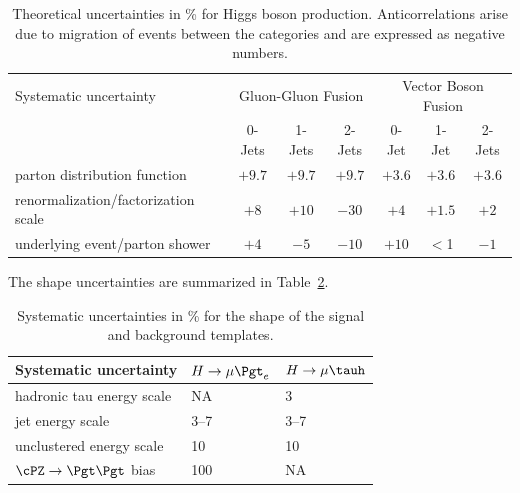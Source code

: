 \begin{table}[hbtp]
 \centering
  \caption{Theoretical uncertainties in \% for Higgs boson production. Anticorrelations arise due to  migration of events between the categories and are expressed as negative numbers. }
  \label{tab:theory_systematics}
  \begin{tabular}{lccc|ccc} \hline
Systematic uncertainty                  &  \multicolumn{3}{c|}{Gluon-Gluon Fusion} &  \multicolumn{3}{c}{Vector Boson Fusion}  \\ \cline{2-7}
                                &    0-Jets  & 1-Jets  & 2-Jets   & 0-Jet & 1-Jet  & 2-Jets  \\ \hline
parton distribution function         &    $+9.7$  &  $+9.7$ &   $+9.7$ & $+3.6$  &   $+3.6$  &  $+3.6$  \\
renormalization/factorization scale           &    $+8$    &  $+10$   &  $-30$   & $+4$     &   $+1.5$  & $+2$   \\
underlying event/parton shower  &   $+4$     & $-5$   &  $-10$   & $+10$    &   $<$1    & $-1$   \\ \hline
  \end{tabular}

\end{table}
The shape uncertainties are summarized in Table~\ref{tab:shape_systematics}.

\begin{table}[hbtp]
 \centering
  \caption{Systematic uncertainties in \% for the shape of the signal and background templates.}
  \label{tab:shape_systematics}
  {
  \begin{tabular}{lll} \hline
Systematic uncertainty                                 &  $H \rightarrow \mu \Pgt_{e}$      &   $H \rightarrow \mu \tauh$                                      \\ \hline
hadronic tau energy scale                              &   NA         &    3                                    \\
jet energy scale                                       &   3--7     &    3--7                                       \\
unclustered energy scale                                &   10      &    10                                   \\
$\cPZ \rightarrow \Pgt\Pgt$ bias                                 &   100 &     NA                                          \\   \hline
  \end{tabular}
}

\end{table}


